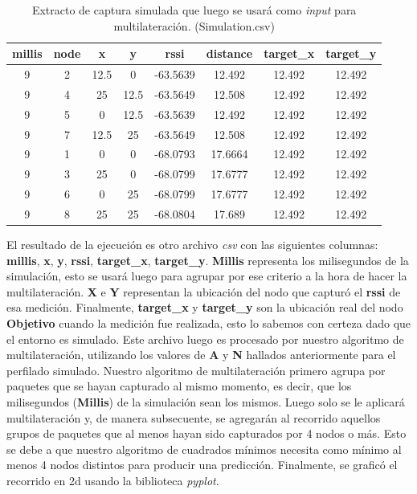 \begin{table}[!htb]
\centering
\begin{tabular}{|c|c|c|c|c|c|c|c|}
\hline
millis & node & x & y & rssi & distance & target_x & target_y \\
\hline
9 & 2 & 12.5 & 0 & -63.5639 & 12.492 & 12.492 & 12.492 \\
9 & 4 & 25 & 12.5 & -63.5649 & 12.508 & 12.492 & 12.492 \\
9 & 5 & 0 & 12.5 & -63.5639 & 12.492 & 12.492 & 12.492 \\
9 & 7 & 12.5 & 25 & -63.5649 & 12.508 & 12.492 & 12.492 \\
9 & 1 & 0 & 0 & -68.0793 & 17.6664 & 12.492 & 12.492 \\
9 & 3 & 25 & 0 & -68.0799 & 17.6777 & 12.492 & 12.492 \\
9 & 6 & 0 & 25 & -68.0799 & 17.6777 & 12.492 & 12.492 \\
9 & 8 & 25 & 25 & -68.0804 & 17.689 & 12.492 & 12.492 \\
\hline
\end{tabular}
\caption{ Extracto de captura simulada que luego se usará como \textit{input} para multilateración. (Simulation.csv)}
\label{table:2}
\end{table}
El resultado de la ejecución es otro archivo \textit{csv} con las siguientes columnas: \textbf{millis}, \textbf{x}, \textbf{y}, \textbf{rssi}, \textbf{target\_x}, \textbf{target\_y}. \textbf{Millis} representa los milisegundos de la simulación, esto se usará luego para agrupar por ese criterio a la hora de hacer la multilateración. \textbf{X} e \textbf{Y} representan la ubicación del nodo que capturó el \textbf{rssi} de esa medición. Finalmente, \textbf{target\_x} y \textbf{target\_y} son la ubicación real del nodo \textbf{Objetivo} cuando la medición fue realizada, esto lo sabemos con certeza dado que el entorno es simulado.
Este archivo luego es procesado por nuestro algoritmo de multilateración, utilizando los valores de \textbf{A} y \textbf{N} hallados anteriormente para el perfilado simulado. Nuestro algoritmo de multilateración primero agrupa por paquetes que se hayan capturado al mismo momento, es decir, que los milisegundos (\textbf{Millis}) de la simulación sean los mismos. Luego solo se le aplicará multilateración y, de manera subsecuente, se agregarán al recorrido aquellos grupos de paquetes que al menos hayan sido capturados por 4 nodos o más. Esto se debe a que nuestro algoritmo de cuadrados mínimos necesita como mínimo al menos 4 nodos distintos para producir una predicción. Finalmente, se graficó el recorrido en 2d usando la biblioteca \textit{pyplot}.
